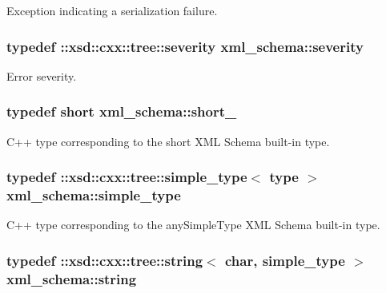Exception indicating a serialization failure. 

\hypertarget{namespacexml__schema_aaac8e21420b35e58ad94533db40ccf41}{}
\subsubsection[{severity}]{\setlength{\rightskip}{0pt plus 5cm}typedef \+::xsd\+::cxx\+::tree\+::severity {\bf xml\+\_\+schema\+::severity}}\label{namespacexml__schema_aaac8e21420b35e58ad94533db40ccf41}


Error severity. 

\hypertarget{namespacexml__schema_a705720c1fed1575ccdcfd21cb7ab39ab}{}
\subsubsection[{short\+\_\+}]{\setlength{\rightskip}{0pt plus 5cm}typedef short {\bf xml\+\_\+schema\+::short\+\_\+}}\label{namespacexml__schema_a705720c1fed1575ccdcfd21cb7ab39ab}


C++ type corresponding to the short X\+M\+L Schema built-\/in type. 

\hypertarget{namespacexml__schema_a44789bb4367951bcf8ae867cb983324d}{}
\subsubsection[{simple\+\_\+type}]{\setlength{\rightskip}{0pt plus 5cm}typedef \+::xsd\+::cxx\+::tree\+::simple\+\_\+type$<$ {\bf type} $>$ {\bf xml\+\_\+schema\+::simple\+\_\+type}}\label{namespacexml__schema_a44789bb4367951bcf8ae867cb983324d}


C++ type corresponding to the any\+Simple\+Type X\+M\+L Schema built-\/in type. 

\hypertarget{namespacexml__schema_aefbaf353f9a0043af46d23d9040ef268}{}
\subsubsection[{string}]{\setlength{\rightskip}{0pt plus 5cm}typedef \+::xsd\+::cxx\+::tree\+::string$<$ char, {\bf simple\+\_\+type} $>$ {\bf xml\+\_\+schema\+::string}}\label{namespacexml__schema_aefbaf353f9a0043af46d23d9040ef268}


